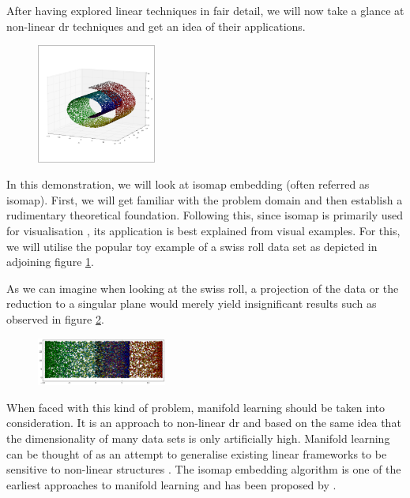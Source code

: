 After having explored linear techniques in fair detail, we will now take a glance at non-linear \acrlong{dr} techniques and get an idea of their applications.

\begin{figure}
	\centering
	\includegraphics[width=0.35\textwidth]{external_content/graphs/swiss_roll.png}
	\captionsetup{justification=centering}
	\label{fig:swissrollfull}
\end{figure}

In this demonstration, we will look at isomap embedding (often referred as isomap).
First, we will get familiar with the problem domain and then establish a rudimentary theoretical foundation.
Following this, since isomap is primarily used for visualisation \cite{HandsOnMLCh8}, its application is best explained from visual examples.
For this, we will utilise the popular toy example of a swiss roll data set as depicted in adjoining figure \ref{fig:swissrollfull}.

As we can imagine when looking at the swiss roll, a projection of the data or the reduction to a \gls{singular} plane would merely yield insignificant results such as observed in figure \ref{fig:swissrollprojection}.

\begin{figure}
	\centering
	\includegraphics[width=0.38\textwidth]{external_content/graphs/swiss_roll-projection.png}
	\captionsetup{justification=centering}
	\label{fig:swissrollprojection}
\end{figure}

\noindent When faced with this kind of problem, manifold learning should be taken into consideration.
It is an approach to non-linear \gls{dr} and based on the same idea that the dimensionality of many data sets is only artificially high.
Manifold learning can be thought of as an attempt to generalise existing linear frameworks to be sensitive to non-linear structures \cite{scikit-learn}.
The isomap embedding algorithm is one of the earliest approaches to manifold learning and has been proposed by .

